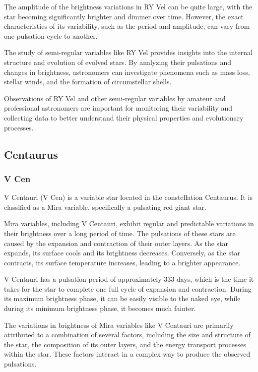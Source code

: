The amplitude of the brightness variations in RY Vel can be quite large, with the star becoming significantly brighter and dimmer over time. However, the exact characteristics of its variability, such as the period and amplitude, can vary from one pulsation cycle to another.

The study of semi-regular variables like RY Vel provides insights into the internal structure and evolution of evolved stars. By analyzing their pulsations and changes in brightness, astronomers can investigate phenomena such as mass loss, stellar winds, and the formation of circumstellar shells.

Observations of RY Vel and other semi-regular variables by amateur and professional astronomers are important for monitoring their variability and collecting data to better understand their physical properties and evolutionary processes.



\subsection{Centaurus}
\subsubsection*{ V Cen }
V Centauri (V Cen) is a variable star located in the constellation Centaurus. It is classified as a Mira variable, specifically a pulsating red giant star.

Mira variables, including V Centauri, exhibit regular and predictable variations in their brightness over a long period of time. The pulsations of these stars are caused by the expansion and contraction of their outer layers. As the star expands, its surface cools and its brightness decreases. Conversely, as the star contracts, its surface temperature increases, leading to a brighter appearance.

V Centauri has a pulsation period of approximately 333 days, which is the time it takes for the star to complete one full cycle of expansion and contraction. During its maximum brightness phase, it can be easily visible to the naked eye, while during its minimum brightness phase, it becomes much fainter.

The variations in brightness of Mira variables like V Centauri are primarily attributed to a combination of several factors, including the size and structure of the star, the composition of its outer layers, and the energy transport processes within the star. These factors interact in a complex way to produce the observed pulsations.

